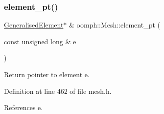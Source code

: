\subsubsection{\texorpdfstring{element\+\_\+pt()}{element\_pt()}\hspace{0.1cm}{\footnotesize\ttfamily [1/4]}}
{\footnotesize\ttfamily \hyperlink{classoomph_1_1GeneralisedElement}{Generalised\+Element}$\ast$ \& oomph\+::\+Mesh\+::element\+\_\+pt (\begin{DoxyParamCaption}\item[{const unsigned long \&}]{e }\end{DoxyParamCaption})\hspace{0.3cm}{\ttfamily [inline]}}



Return pointer to element e. 



Definition at line 462 of file mesh.\+h.



References e.



